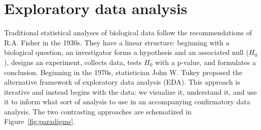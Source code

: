 \section{Exploratory data analysis}

Traditional statistical analyses of biological data follow the recommendations of R.A. Fisher in the 1930s\citep{holmes_modern_2019}. They have a linear structure: beginning with a biological question, an investigator forms a hypothesis and an associated null ($H_0$), designs an experiment, collects data, tests $H_0$ with a p-value, and formulates a conclusion. Beginning in the 1970s, statistician John W. Tukey proposed the alternative framework of exploratory data analysis (EDA)\citep{tukey_1977,hoaglin_john_2003}. This approach is iterative and instead begins with the data: we visualize it, understand it, and use it to inform what sort of analysis to use in an accompanying confirmatory data analysis. The two contrasting approaches are schematized in Figure~\ref{fig:paradigms}.

